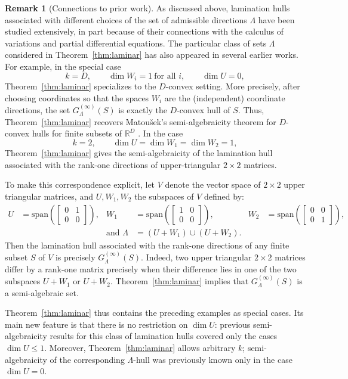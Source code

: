 \documentclass[10pt]{amsart}
\theoremstyle{plain}
\theoremstyle{definition}
\newtheorem{remark}[lemma]{Remark}
\let\leq\leqslant
\begin{document}
\begin{remark}[Connections to prior work]
As discussed above, lamination hulls associated with different choices of the set of admissible directions $\Lambda$ have been studied extensively, in part because of their connections with the calculus of variations and partial differential equations. 
The particular class of sets $\Lambda$ considered in Theorem~\ref{thm:laminar} has also appeared in several earlier works.
For example, in the special case 
\[
        k=D,\qquad \dim W_i=1\ \text{for all }i,\qquad \dim U=0,
\]
Theorem~\ref{thm:laminar} specializes to the $D$-convex setting. 
More precisely, after choosing coordinates so that the spaces $W_i$ are the (independent) coordinate directions, the set $G^{(\infty)}_\Lambda(S)$ is exactly the $D$-convex hull of $S$. 
Thus, Theorem~\ref{thm:laminar} recovers Matou\v{s}ek's semi-algebraicity theorem for $D$-convex hulls for finite subsets of $\mathbb R^D$ \cite{Matousek2001}. 
In the case
\[
k=2,\qquad
\dim U=\dim W_1=\dim W_2=1,
\]
Theorem~\ref{thm:laminar} gives the semi-algebraicity of the lamination hull associated
with the rank-one directions of upper-triangular \(2\times2\) matrices.

To make this correspondence explicit, let $V$ denote the vector space of $2 \times 2$ upper triangular matrices,
and $U,W_1,W_2$ the subspaces of $V$ defined by:
\begin{align*}
U &= \mathrm{span}\left(\begin{bmatrix} 0 & 1 \\0 & 0 \end{bmatrix}\right), &
W_1 &= \mathrm{span}\left(\begin{bmatrix} 1 & 0 \\0 & 0 \end{bmatrix}\right), &
W_2 &= \mathrm{span}\left(\begin{bmatrix} 0 & 0 \\0 & 1 \end{bmatrix}\right), \\
&& \text{and }\Lambda &= (U+W_1) \cup  (U + W_2).
\end{align*}
Then the lamination hull associated with the rank-one directions
of any finite subset $S$ of $V$ is precisely
$G^{(\infty)}_\Lambda(S)$.
Indeed, two upper triangular \(2\times2\) matrices differ by a rank-one
matrix precisely when their difference lies in one of the two subspaces
\(U+W_1\) or \(U+W_2\).
Theorem~\ref{thm:laminar} implies that 
$G^{(\infty)}_\Lambda(S)$ is  a semi-algebraic set.

Theorem~\ref{thm:laminar} thus contains the preceding examples as special cases. 
Its main new feature is that there is no restriction on $\dim U$: previous semi-algebraicity results for this class of lamination hulls covered only the cases $\dim U\leq 1$.
Moreover, Theorem~\ref{thm:laminar} allows arbitrary $k$; semi-algebraicity of the corresponding $\Lambda$-hull was previously known only in the case $\dim U=0$. 
\end{remark}
\end{document}
